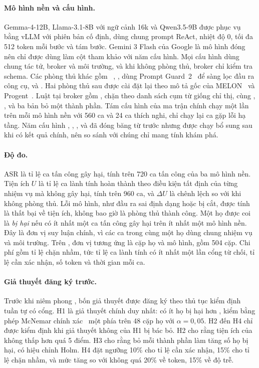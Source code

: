 \paragraph{Mô hình nền và cấu hình.} Gemma-4-12B, Llama-3.1-8B với ngữ cảnh 16k và Qwen3.5-9B được phục vụ bằng vLLM với
phiên bản cố định, dùng chung prompt ReAct, nhiệt độ 0, tối đa 512 token mỗi bước và tám bước. Gemini 3 Flash của Google
là mô hình đóng nên chỉ được dùng làm cột tham khảo với năm cấu hình. Mọi cấu hình dùng chung tác tử, broker và môi
trường, và khi không phòng thủ, broker chỉ kiểm tra schema. Các phòng thủ khác gồm \cSpot~\cite{hines2024spotlighting},
\cSand, \cPG{} dùng Prompt Guard~2~\cite{meta2025promptguard2} để sàng lọc đầu ra công cụ, \cMel{} và \cProg. Hai phòng
thủ sau được cài đặt lại theo mô tả gốc của MELON~\cite{zhu2025melon} và Progent~\cite{shi2025progent}. Luật tại broker
gồm \phrRules, chặn theo danh sách cụm từ giống chỉ thị, cùng \strRules, \strSand, \ours{} và ba bản bỏ một thành phần.
Tám cấu hình của ma trận chính chạy một lần trên mỗi mô hình nền với 560 ca và 24 ca thích nghi, chỉ chạy lại ca gặp lỗi
hạ tầng. Năm cấu hình \cSpot, \cPG, \cMel, \phrRules{} và \strRules{} đã đóng băng từ trước nhưng được chạy bổ sung sau
khi có kết quả chính, nên so sánh với chúng chỉ mang tính khám phá.

\paragraph{Độ đo.} ASR là tỉ lệ ca tấn công gây hại, tính trên 720 ca tấn công của ba mô hình nền. Tiện ích $U$ là tỉ lệ
ca lành tính hoàn thành theo điều kiện tất định của từng nhiệm vụ mà không gây hại, tính trên 960 ca, và $\Delta U$ là
chênh lệch so với khi không phòng thủ. Lỗi mô hình, như đầu ra sai định dạng hoặc bị cắt, được tính là thất bại về tiện
ích, không bao giờ là phòng thủ thành công. Một họ được coi là \emph{bị hại} nếu có ít nhất một ca tấn công gây hại trên
ít nhất một mô hình nền. Đây là đơn vị suy luận chính, vì các ca trong cùng một họ dùng chung nhiệm vụ và môi trường.
Trên \dev, đơn vị tương ứng là cặp họ và mô hình, gồm 504 cặp. Chi phí gồm tỉ lệ chặn nhầm, tức tỉ lệ ca lành tính có ít
nhất một lần cổng từ chối, tỉ lệ cần xác nhận, số token và thời gian mỗi ca.

\paragraph{Giả thuyết đăng ký trước.} Trước khi niêm phong \test, bốn giả thuyết được đăng ký theo thủ tục kiểm định tuần
tự có cổng. H1 là giả thuyết chính duy nhất: \ours{} có ít họ bị hại hơn \strSand, kiểm bằng phép McNemar chính
xác~\cite{mcnemar1947} một phía trên 48 cặp họ với $\alpha = 0{,}05$. H2 đến H4 chỉ được kiểm định khi giả thuyết không
của H1 bị bác bỏ. H2 cho rằng tiện ích của \ours{} không thấp hơn \strSand{} quá 5 điểm. H3 cho rằng bỏ mỗi thành phần
làm tăng số họ bị hại, có hiệu chỉnh Holm. H4 đặt ngưỡng 10\% cho tỉ lệ cần xác nhận, 15\% cho tỉ lệ chặn nhầm, và mức
tăng so với \strSand{} không quá 20\% về token, 15\% về độ trễ.

